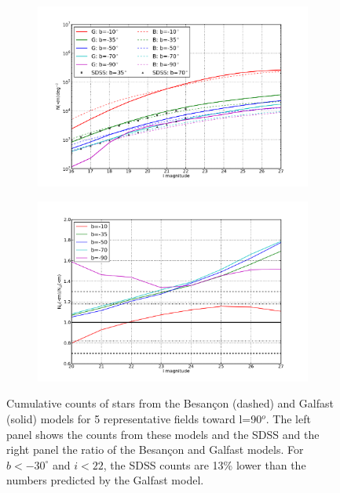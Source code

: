 \documentclass[11pt]{article}
\begin{document}


\begin{figure}[h]
\centering
\begin{subfigure}[b]{0.45\textwidth}
\includegraphics[width=\textwidth]{validation_figures/cumulative_stars_90_besancon_dust.png}
\label{fig:scounts_0}
\end{subfigure}
\begin{subfigure}[b]{0.45\textwidth}
\centering
\includegraphics[width=\textwidth]{validation_figures/cumulative_ratio_stars_90_besancon_dust.png}
\label{fig:sratio_90}
\end{subfigure}
\caption{Cumulative counts of stars from the Besan\c{c}on (dashed) and
  Galfast (solid) models for 5 representative fields toward
  l=90$^o$. The left panel shows the counts from these models and the
  SDSS and the right panel the ratio of the Besan\c{c}on and Galfast
  models. For $b<-30^{\circ}$ and $i<22$, the SDSS counts are 13\%
  lower than the numbers predicted by the Galfast model.}
  \end{figure}
\end{document}
